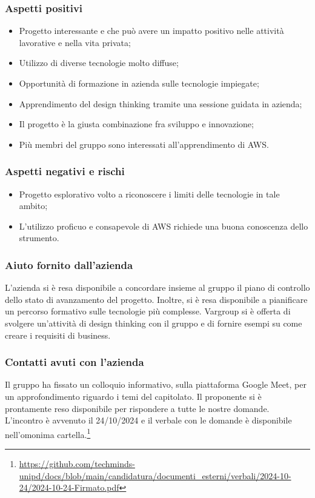 \documentclass[10pt]{article}
\begin{document}
\subsubsection{Aspetti positivi}
\begin{itemize}
    \item Progetto interessante e che può avere un impatto positivo nelle attività lavorative e nella vita privata;
    \item Utilizzo di diverse tecnologie molto diffuse;
    \item Opportunità di formazione in azienda sulle tecnologie impiegate;
    \item Apprendimento del design thinking tramite una sessione guidata in azienda;
    \item Il progetto è la giusta combinazione fra sviluppo e innovazione;
    \item Più membri del gruppo sono interessati all’apprendimento di AWS.
\end{itemize}
\subsubsection{Aspetti negativi e rischi}
\begin{itemize}
    \item Progetto esplorativo volto a riconoscere i limiti delle tecnologie in tale ambito;
    \item L’utilizzo proficuo e consapevole di AWS richiede una buona conoscenza dello strumento.
\end{itemize}
\subsubsection{Aiuto fornito dall'azienda}
L’azienda si è resa disponibile a concordare insieme al gruppo il piano di controllo dello stato di avanzamento del progetto. Inoltre, si è resa disponibile a pianificare un percorso formativo sulle tecnologie più complesse.
Vargroup si è offerta di svolgere un’attività di design thinking con il gruppo e di fornire esempi su come creare i requisiti di business.
\subsubsection{Contatti avuti con l'azienda}
Il gruppo ha fissato un colloquio informativo, sulla piattaforma Google Meet, per un approfondimento riguardo i temi del capitolato. Il proponente si è prontamente reso disponibile per rispondere a tutte le nostre domande. L'incontro è avvenuto il 24/10/2024 e il verbale con le domande è disponibile nell'omonima cartella.\footnote{\url{https://github.com/techminds-unipd/docs/blob/main/candidatura/documenti_esterni/verbali/2024-10-24/2024-10-24-Firmato.pdf}}
\end{document}
